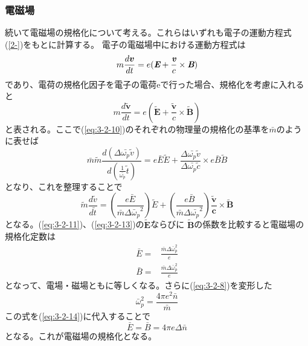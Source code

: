 \documentclass[a4paper,11pt,titlepage]{jsarticle}
\begin{document}
  \subsubsection{電磁場}
  続いて電磁場の規格化について考える。これらはいずれも電子の運動方程式(\ref{2-})をもとに計算する。
  電子の電磁場中における運動方程式は
  \begin{equation}
    \label{eq:3-2-10}
    m \frac{d\bm{v}}{dt}=e(\textit{\textbf{E}}+
    \frac{\textit{\textbf{v}}}{c} \times \textit{\textbf{B}})
  \end{equation}
  であり、電荷の規格化因子を電子の電荷eで行った場合、規格化を考慮に入れると
  \begin{equation}
    \label{eq:3-2-11}
    m \frac{ d \tilde{\bm{v}} }{ dt } 
    = e ( \tilde{\bm{E}} + \frac{ \tilde{\bm{v}} }{c} \times \bm{\tilde{B}} )
  \end{equation}
  と表される。ここで(\ref{eq:3-2-10})のそれぞれの物理量の規格化の基準を$\bar m$のように表せば
  \begin{equation}
    \label{eq:3-2-12}
    {\bar m}{\tilde m}\frac{d(\Delta {\bar {\omega_p}} {\tilde v})}
    {d(\frac{1}{\bar {\omega_p}} \tilde t)}
    =e {\bar E} {\tilde E} + \frac{\Delta {\bar{\omega_p}}{\tilde v}}
    {\Delta {\bar{\omega_p}}{\tilde c}} \times e {\bar B}{\tilde B}
  \end{equation}
  となり、これを整理することで
  \begin{equation}
    \label{eq:3-2-13}
    \tilde{m} \frac{ d \tilde{v} }{ d \tilde{t} }
    = (\frac{e\bar E}{{\bar m} \Delta {\bar \omega_p}^2}){\tilde E} 
    + (\frac {e \bar{B} }{ \bar{m} \Delta \bar{\omega_p}^2}) 
    \frac{ \tilde{ \bm{v} } }{ \bm{c} } \times \tilde{ \bm{B} } 
  \end{equation}
  となる。(\ref{eq:3-2-11})、(\ref{eq:3-2-13})の$\tilde{\bm{E}}$ならびに
  $\tilde{\bm{B}}$の係数を比較すると電磁場の規格化定数は
  \begin{align}
    \label{eq:3-2-14}
    \bar E =&\frac{\bar m \Delta \bar \omega_p^2}{e}\\  
    \label{eq:3-2-15}
    \bar B =&\frac{\bar m \Delta \bar \omega_p^2}{e}  
  \end{align}
  となって、電場・磁場ともに等しくなる。さらに(\ref{eq:3-2-8})を変形した
  \begin{equation}
    \label{eq:3-2-16}
    \bar \omega_p^2 = \frac{4 \pi e^2 \bar n}{\bar m}
  \end{equation}
  この式を(\ref{eq:3-2-14})に代入することで
  \begin{equation}
    \label{eq:3-2-17}
    \bar E = \bar B = 4\pi e \Delta \bar n
  \end{equation}
  となる。これが電磁場の規格化となる。\\
\end{document}
